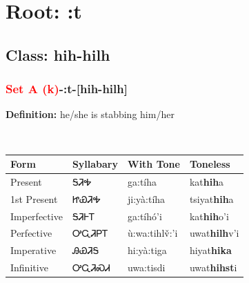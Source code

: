 \needspace{4in}
\section*{Root: :t}
\nopagebreak
{}
\needspace{3in}
\subsection*{Class: hih-hilh}
\nopagebreak
\needspace{2in}
\subsubsection*{\textcolor{Red}{Set A (k)}{-}\textbf{:t}{-}[hih-hilh]}
\nopagebreak
\textbf{Definition: } he/she is stabbing him/her
\\[0.5em]
\begin{tabularx}{\textwidth}{l X X X}%
\toprule%
\textbf{Form}&\textbf{Syllabary}&\textbf{With Tone}&\textbf{Toneless}\\%
\midrule%
Present&ᎦᏘᎭ&ga:tíha&kat\textbf{hih}a\\%
1st Present&ᏥᏯᏘᎭ&ji:yà:tíha&tsiyat\textbf{hih}a\\%
Imperfective&ᎦᏘᎰᎢ&ga:tíhó’i&kat\textbf{hih}o'i\\%
Perfective&ᎤᏩᏘᏢᎢ&ù:wa:tihlv̌:’i&uwat\textbf{hilh}v'i\\%
Imperative&ᎯᏯᏘᎦ&hi:yà:tiga&hiyat\textbf{hika}\\%
Infinitive&ᎤᏩᏘᏍᏗ&uwa:tisdi&uwat\textbf{hihst}i\\%
\bottomrule%
\end{tabularx}
\\[1em]